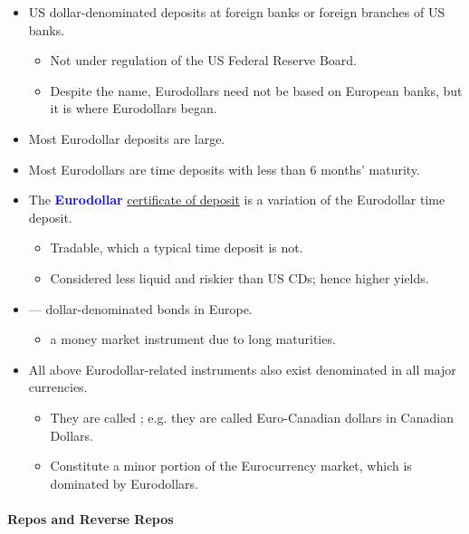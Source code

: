 \documentclass[notoc,notitlepage]{tufte-book}
\begin{document}
\begin{itemize}
  \item US dollar-denominated deposits at foreign banks or
    foreign branches of US banks.
    \begin{itemize}
      \item Not under regulation of the US Federal Reserve Board.
      \item Despite the name, Eurodollars need not be based on
        European banks, but it is where Eurodollars began.
    \end{itemize}
  \item Most Eurodollar deposits are large.
  \item Most Eurodollars are time deposits with less than 6 months' maturity.
  \item The \textbf{\textcolor{blue}{Eurodollar}}
    \hyperref[para:certificates_of_deposit]
    {certificate of deposit}
    is a variation of the Eurodollar time deposit.
    \begin{itemize}
      \item Tradable, which a typical time deposit is not.
      \item Considered less liquid and riskier than US CDs;
        hence higher yields.
    \end{itemize}
  \item {} --- dollar-denominated bonds in Europe.
    \begin{itemize}
      \item {} a money market instrument due to long maturities.
    \end{itemize}
  \item All above Eurodollar-related instruments also exist denominated
    in all major currencies.
    \begin{itemize}
      \item They are called ; e.g.
        they are called Euro-Canadian dollars in Canadian Dollars.
      \item Constitute a minor portion of the Eurocurrency market,
        which is dominated by Eurodollars.
    \end{itemize}
\end{itemize}

\paragraph{Repos and Reverse Repos}\label{para:repos_and_reverse_repos}
\end{document}
